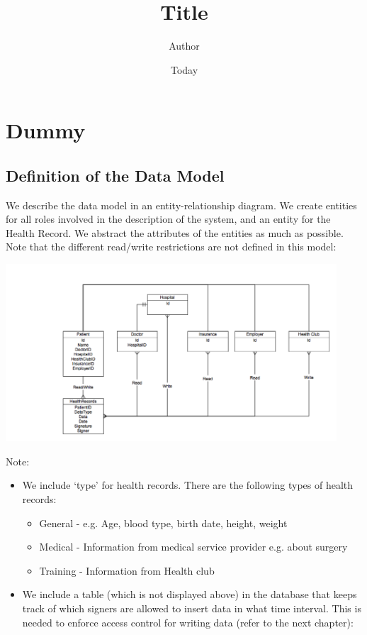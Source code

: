 \documentclass[]{article}
\begin{document}
\title{Title}
\author{Author}
\date{Today}
\maketitle
\section{Dummy}

\subsection{Definition of the Data Model}
We describe the data model in an entity-relationship diagram. We create entities for all roles involved in the description of the system, and an entity for the Health Record. We abstract the attributes of the entities as much as possible. Note that the different read/write restrictions are not defined in this model:

\includegraphics[width=350pt]{datamodel.png}

Note: 
\begin{itemize}
\item We include ‘type’ for health records. There are the following types of health records:
\begin{itemize}
\item General - e.g. Age, blood type, birth date, height, weight 
\item Medical - Information from medical service provider e.g. about surgery
\item Training - Information from Health club
\end{itemize}
\item We include a table (which is not displayed above) in the database that keeps track of  which signers are allowed to insert data in what time interval. This is needed to enforce access control for writing data (refer to the next chapter):
\end{itemize}
\end{document}
